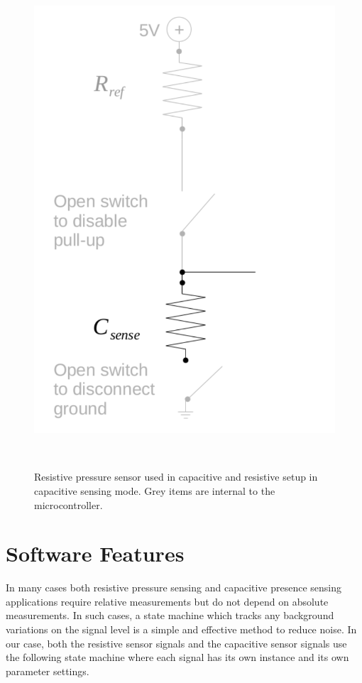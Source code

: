 \documentclass{sigchi}
\begin{document}
\begin{figure}[!htbp]
\centering
  \includegraphics[width=0.9\columnwidth]{figures/cap_res_setup_cap}
  \caption{Resistive pressure sensor used in capacitive and resistive setup in
capacitive sensing mode. Grey items are internal to the
microcontroller.}~\label{fig:cap_res_setup_cap}
\end{figure}

\section{Software Features}
In many cases both resistive pressure sensing and capacitive presence sensing
applications require relative measurements but do not depend on absolute
measurements. In such cases, a state machine which tracks any background
variations on the signal level is a simple and effective method to reduce noise.
In our case, both the resistive sensor signals and the capacitive sensor signals
use the following state machine where each signal has its own instance and
its own parameter settings.
\end{document}

